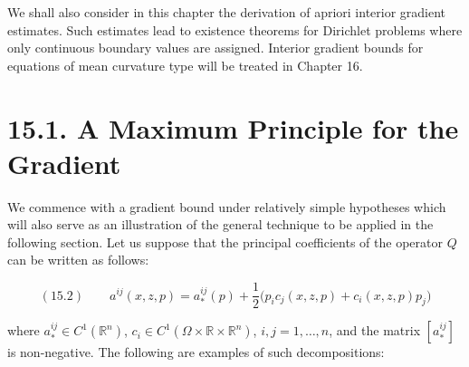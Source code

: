 We shall also consider in this chapter the derivation of apriori interior gradient
estimates. Such estimates lead to existence theorems for Dirichlet problems where
only continuous boundary values are assigned. Interior gradient bounds for
equations of mean curvature type will be treated in Chapter 16.

\section*{15.1. A Maximum Principle for the Gradient}

We commence with a gradient bound under relatively simple hypotheses which will
also serve as an illustration of the general technique to be applied in the following
section. Let us suppose that the principal coefficients of the operator $Q$ can be
written as follows:

\[
(15.2)\qquad a^{ij}(x,z,p)=a^{ij}_*(p)+\frac12\bigl(p_i c_j(x,z,p)+c_i(x,z,p)p_j\bigr)
\]

where $a^{ij}_*\in C^1(\mathbb{R}^n)$, $c_i\in C^1(\Omega\times\mathbb{R}\times\mathbb{R}^n)$, $i,j=1,\ldots,n$, and the matrix $[a^{ij}_*]$ is non-negative. The following are examples of such decompositions:
